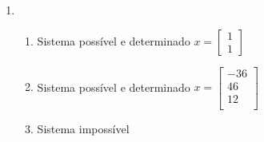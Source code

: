 \documentclass[a4paper]{article}
\begin{document}
\begin{enumerate}
\item %
  \begin{enumerate}
  \item Sistema possível e determinado
    $x =
    \begin{bmatrix}
      1\\
      1
    \end{bmatrix}$

  \item Sistema possível e determinado
    $x =
    \begin{bmatrix}
      -36\\
      46\\
      12\\
    \end{bmatrix}$

  \item Sistema impossível


\end{enumerate}
\end{enumerate}
\end{document}
